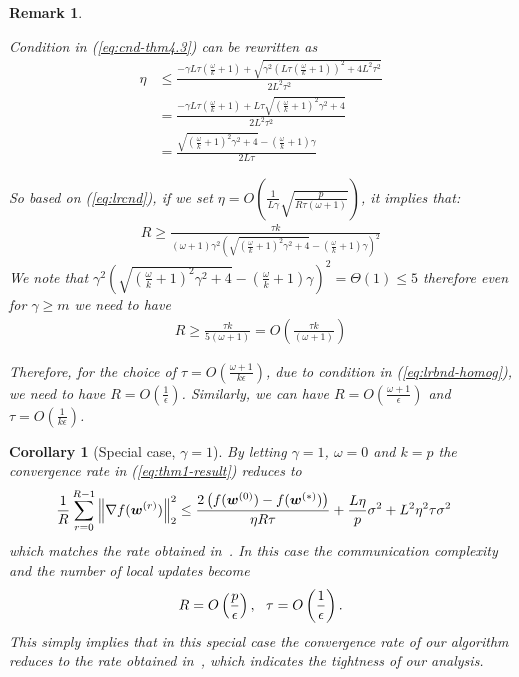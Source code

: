 \documentclass[twoside]{article}
\newtheorem{remark}{Remark}
\newtheorem{corollary}{Corollary}
\begin{document}
\begin{remark}\label{rmk:cnd-lr}

Condition in (\ref{eq:cnd-thm4.3}) can be rewritten as 
\begin{align}
    \eta&\leq \frac{-\gamma L\tau\left(\frac{\omega}{k}+1\right)+\sqrt{\gamma^2 \left(L\tau\left(\frac{\omega}{k}+1\right)\right)^2+4L^2\tau^2}}{2L^2\tau^2}\nonumber\\
    &= \frac{-\gamma L\tau\left(\frac{\omega}{k}+1\right)+L\tau\sqrt{\left(\frac{\omega}{k}+1\right)^2\gamma^2 +4}}{2L^2\tau^2}\nonumber\\
    &=\frac{\sqrt{\left(\frac{\omega}{k}+1\right)^2\gamma^2 +4}-\left(\frac{\omega}{k}+1\right)\gamma}{2L\tau}\label{eq:lrcnd}
\end{align}

So based on (\ref{eq:lrcnd}), if we set $\eta=O\left(\frac{1}{L\gamma}\sqrt{\frac{p}{R\tau\left(\omega+1\right)}}\right)$, it implies that:
\begin{align}
    R\geq \frac{\tau k}{\left(\omega+1\right)\gamma^2\left(\sqrt{\left(\frac{\omega}{k}+1\right)^2\gamma^2+4}-\left(\frac{\omega}{k}+1\right)\gamma\right)^2}\label{eq:iidexact}
\end{align}
We note that $\gamma^2\left(\sqrt{\left(\frac{\omega}{k}+1\right)^2\gamma^2+4}-\left(\frac{\omega}{k}+1\right)\gamma\right)^2=\Theta(1)\leq 5 $ therefore even for $\gamma\geq m$ we need to have 
\begin{align}
    R\geq \frac{\tau k}{5\left(\omega+1\right)}=O\left(\frac{\tau k}{\left(\omega+1\right)}\right)\label{eq:lrbnd-homog}
\end{align}

{Therefore, for the choice of $\tau=O\left(\frac{\omega+1}{k\epsilon}\right)$, due to condition in (\ref{eq:lrbnd-homog}), we need to have $R=O\left(\frac{1}{\epsilon}\right)$. Similarly, we can have $R=O\left(\frac{\omega+1}{\epsilon}\right)$ and $\tau=O\left(\frac{1}{k\epsilon}\right)$.}


\end{remark}

\begin{corollary}[Special case, $\gamma=1$]
By letting $\gamma=1$, $\omega=0$ and $k=p$ the convergence rate in (\ref{eq:thm1-result}) reduces to 
\begin{align}\notag
     \frac{1}{R}\sum_{r=0}^{R-1}\left\|\nabla f({\boldsymbol{w}}^{(r)})\right\|_2^2&\leq \frac{2\left(f(\boldsymbol{w}^{(0)})-f(\boldsymbol{w}^{(*)})\right)}{\eta R\tau}+\frac{L\eta }{p}\sigma^2+{L^2\eta^2\tau }\sigma^2
\end{align}
which matches the rate  obtained in~\cite{wang2018cooperative}. In this case the communication complexity and the number of local updates become 
\begin{align}\notag
    {R}=O\left(\frac{p}{\epsilon}\right), \:\:\: \tau=O\left(\frac{1}{\epsilon}\right).
\end{align}
This simply implies  that in this special case the convergence rate of our algorithm reduces to the  rate obtained in~\cite{wang2018cooperative}, which indicates the tightness of  our analysis.
\end{corollary}
\end{document}
